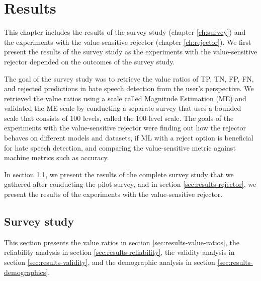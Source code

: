 \chapter{Results}
This chapter includes the results of the survey study (chapter \ref{ch:survey}) and the experiments with the value-sensitive rejector (chapter \ref{ch:rejector}).
%
We first present the results of the survey study as the experiments with the value-sensitive rejector depended on the outcomes of the survey study.
%

%
The goal of the survey study was to retrieve the value ratios of TP, TN, FP, FN, and rejected predictions in hate speech detection from the user's perspective.
%
We retrieved the value ratios using a scale called Magnitude Estimation (ME) and validated the ME scale by conducting a separate survey that uses a bounded scale that consists of 100 levels, called the 100-level scale.
%
The goals of the experiments with the value-sensitive rejector were finding out how the rejector behaves on different models and datasets, if ML with a reject option is beneficial for hate speech detection, and comparing the value-sensitive metric against machine metrics such as accuracy.
%

%
In section \ref{sec:results-survey-study}, we present the results of the complete  survey study that we gathered after conducting the pilot survey, and in section \ref{sec:results-rejector}, we present the results of the experiments with the value-sensitive rejector.

\section{Survey study}
\label{sec:results-survey-study}
This section presents the value ratios in section \ref{sec:results-value-ratios}, the reliability analysis in section \ref{sec:results-reliability}, the validity analysis in section \ref{sec:results-validity}, and the demographic analysis in section \ref{sec:results-demographics}.
%


